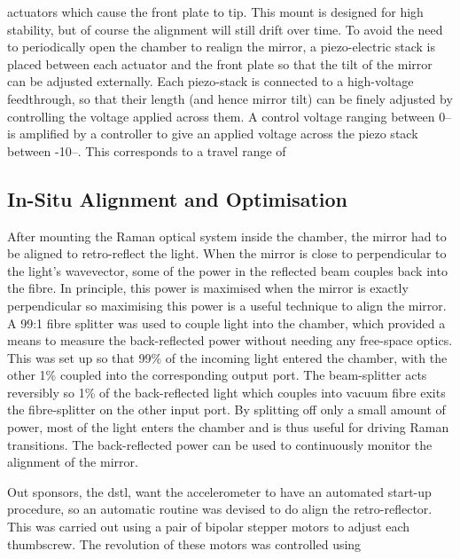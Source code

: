 actuators which cause the front plate to tip. This mount
is designed for high stability, but of course the alignment will still drift
over time. To avoid the need to periodically open the chamber to realign the
mirror, a piezo-electric stack is placed between each actuator and the front
plate so that the tilt of the mirror can be adjusted externally. Each
piezo-stack is connected to a high-voltage feedthrough, so that their length
(and hence mirror tilt) can be finely adjusted by controlling the voltage
applied across them. A control voltage ranging between 0-- is
amplified by a controller to give an applied voltage across the piezo stack
between -10--. This corresponds to a travel range of
\subsection{In-Situ Alignment and Optimisation}\label{sec:in_situ} 
After mounting the Raman optical system inside the chamber, the
mirror had to be aligned to retro-reflect the light. When the mirror is close to
perpendicular to the light's wavevector, some of the power in the reflected beam
couples back into the fibre. In principle, this power is maximised when the
mirror is exactly perpendicular so maximising this power is a useful technique
to align the mirror. A 99:1 fibre splitter was used to couple light into the
chamber, which provided a means to measure the back-reflected power without
needing any free-space optics. This was set up so that 99\% of the incoming
light entered the chamber, with the other 1\% coupled into the corresponding
output port. The beam-splitter acts reversibly so 1\% of the
back-reflected light which couples into vacuum fibre exits the fibre-splitter on
the other input port.  
By splitting off only a small amount of
power, most of the light enters the chamber and is thus useful for
driving Raman transitions. The back-reflected power can be used to 
continuously monitor the alignment of the mirror.
\par\noindent 
Out sponsors, the dstl, want the accelerometer to have an automated
start-up procedure, so an automatic routine was devised to do align
the retro-reflector. This was carried out using
a pair of bipolar stepper motors to adjust each thumbscrew. The revolution of these motors was controlled using
